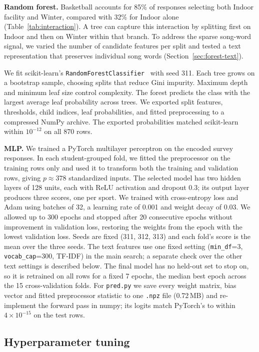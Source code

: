 \documentclass[12pt]{article}
\begin{document}
\textbf{Random forest.} Basketball accounts for 85\% of responses selecting both Indoor
facility and Winter, compared with 32\% for Indoor alone (Table~\ref{tab:interaction}). A tree
can capture this interaction by splitting first on Indoor and then on Winter within that branch.
To address the sparse song-word signal, we varied the number of candidate features per split
and tested a text representation that preserves individual song words
(Section~\ref{sec:forest-text}).

We fit scikit-learn's \texttt{RandomForestClassifier}~\cite{pedregosa2011scikit} with seed 311.
Each tree grows on a bootstrap sample, choosing splits that reduce Gini impurity. Maximum depth
and minimum leaf size control complexity. The forest predicts the class with the largest average
leaf probability across trees. We exported split features, thresholds, child indices, leaf
probabilities, and fitted preprocessing to a compressed NumPy archive. The exported probabilities matched scikit-learn within $10^{-12}$ on all 870 rows.

\textbf{MLP.} We trained a PyTorch multilayer perceptron on the encoded survey responses. In each
student-grouped fold, we fitted the preprocessor on the training rows only and used it to transform
both the training and validation rows, giving $p\approx378$ standardized inputs. The selected model
has two hidden layers of 128 units, each with ReLU activation and dropout 0.3; its output layer
produces three scores, one per sport. We trained with cross-entropy loss and Adam using batches of
32, a learning rate of 0.001 and weight decay of 0.03. We allowed up to 300 epochs and stopped after
20 consecutive epochs without improvement in validation loss, restoring the weights from the epoch
with the lowest validation loss. Seeds are fixed (311, 312, 313) and each fold's score is the mean
over the three seeds. The text features use one fixed setting (\texttt{min\_df}=3,
\texttt{vocab\_cap}=300, TF-IDF) in the main search; a separate check over the other text settings
is described below. The final model has no held-out set to stop on, so it is retrained on all rows for a
fixed 7 epochs, the median best epoch across the 15 cross-validation folds. For \texttt{pred.py} we
save every weight matrix, bias vector and fitted preprocessor statistic to one \texttt{.npz} file
(0.72\,MB) and re-implement the forward pass in numpy; its logits match PyTorch's to within
$4\times10^{-15}$ on the test rows.

\subsection{Hyperparameter tuning}
\end{document}
